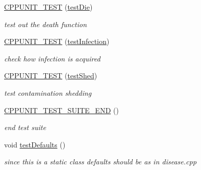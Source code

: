 \begin{DoxyCompactItemize}
\mbox{\label{classdiseaseTest_aae0e823489f65dce639bc1fec9105d25}} 
\mbox{\hyperlink{classdiseaseTest_aae0e823489f65dce639bc1fec9105d25}{C\+P\+P\+U\+N\+I\+T\+\_\+\+T\+E\+ST}} (\mbox{\hyperlink{classdiseaseTest_a703842c90288f26dbe79fec811b7e214}{test\+Die}})
\begin{DoxyCompactList}\small\item\em test out the death function \end{DoxyCompactList}\item 
\mbox{\label{classdiseaseTest_af0c1b19108a6cc01a63fb65dda68da43}} 
\mbox{\hyperlink{classdiseaseTest_af0c1b19108a6cc01a63fb65dda68da43}{C\+P\+P\+U\+N\+I\+T\+\_\+\+T\+E\+ST}} (\mbox{\hyperlink{classdiseaseTest_ac6ddc9154b76e19798cd72c144d67c53}{test\+Infection}})
\begin{DoxyCompactList}\small\item\em check how infection is acquired \end{DoxyCompactList}\item 
\mbox{\label{classdiseaseTest_a8353330ff74b1589854261529a113c9b}} 
\mbox{\hyperlink{classdiseaseTest_a8353330ff74b1589854261529a113c9b}{C\+P\+P\+U\+N\+I\+T\+\_\+\+T\+E\+ST}} (\mbox{\hyperlink{classdiseaseTest_aec9719173d92e888f32ada40f567467a}{test\+Shed}})
\begin{DoxyCompactList}\small\item\em test contamination shedding \end{DoxyCompactList}\item 
\mbox{\label{classdiseaseTest_a1940da2c66267bf403173256c7f112aa}} 
\mbox{\hyperlink{classdiseaseTest_a1940da2c66267bf403173256c7f112aa}{C\+P\+P\+U\+N\+I\+T\+\_\+\+T\+E\+S\+T\+\_\+\+S\+U\+I\+T\+E\+\_\+\+E\+ND}} ()
\begin{DoxyCompactList}\small\item\em end test suite \end{DoxyCompactList}\item 
\mbox{\label{classdiseaseTest_a76ac8d52f421ccb010d5be72228fe613}} 
void \mbox{\hyperlink{classdiseaseTest_a76ac8d52f421ccb010d5be72228fe613}{test\+Defaults}} ()
\begin{DoxyCompactList}\small\item\em since this is a static class defaults should be as in disease.\+cpp \end{DoxyCompactList}\item 

\end{DoxyCompactItemize}
